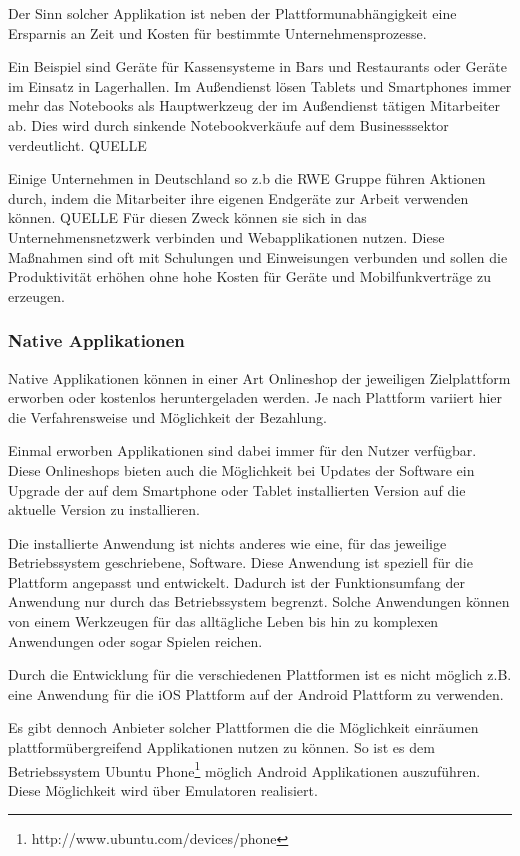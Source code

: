 Der Sinn solcher Applikation ist neben der Plattformunabhängigkeit eine Ersparnis an Zeit und Kosten für bestimmte Unternehmensprozesse.

Ein Beispiel sind Geräte für Kassensysteme in Bars und Restaurants oder Geräte im Einsatz in Lagerhallen. Im Außendienst lösen Tablets und Smartphones immer mehr das Notebooks als Hauptwerkzeug der im Außendienst tätigen Mitarbeiter ab. Dies wird durch sinkende Notebookverkäufe auf dem Businesssektor verdeutlicht. QUELLE

Einige Unternehmen in Deutschland so z.b die RWE Gruppe führen Aktionen durch, indem die Mitarbeiter ihre eigenen Endgeräte zur Arbeit verwenden können. QUELLE Für diesen Zweck können sie sich in das Unternehmensnetzwerk verbinden und Webapplikationen nutzen. Diese Maßnahmen sind oft mit Schulungen und Einweisungen verbunden und sollen die Produktivität erhöhen ohne hohe Kosten für Geräte und Mobilfunkverträge zu erzeugen.

\subsubsection{Native Applikationen}
\label{natand}

Native Applikationen können in einer Art Onlineshop der jeweiligen Zielplattform erworben oder kostenlos heruntergeladen werden. Je nach Plattform variiert hier die Verfahrensweise und Möglichkeit der Bezahlung.

Einmal erworben Applikationen sind dabei immer für den Nutzer verfügbar. Diese Onlineshops bieten auch die Möglichkeit bei Updates der Software ein Upgrade der auf dem Smartphone oder Tablet installierten Version auf die aktuelle Version zu installieren.

Die installierte Anwendung ist nichts anderes wie eine, für das jeweilige Betriebssystem geschriebene, Software. Diese Anwendung ist speziell für die Plattform angepasst und entwickelt. Dadurch ist der Funktionsumfang der Anwendung nur durch das Betriebssystem begrenzt. Solche Anwendungen können von einem Werkzeugen für das alltägliche Leben bis hin zu komplexen Anwendungen oder sogar Spielen reichen.

Durch die Entwicklung für die verschiedenen Plattformen ist es nicht möglich z.B. eine Anwendung für die iOS Plattform auf der Android Plattform zu verwenden.

Es gibt dennoch Anbieter solcher Plattformen die die Möglichkeit einräumen plattformübergreifend Applikationen nutzen zu können. So ist es dem Betriebssystem Ubuntu Phone\footnote{http://www.ubuntu.com/devices/phone} möglich Android Applikationen auszuführen. Diese Möglichkeit wird über Emulatoren realisiert. 


